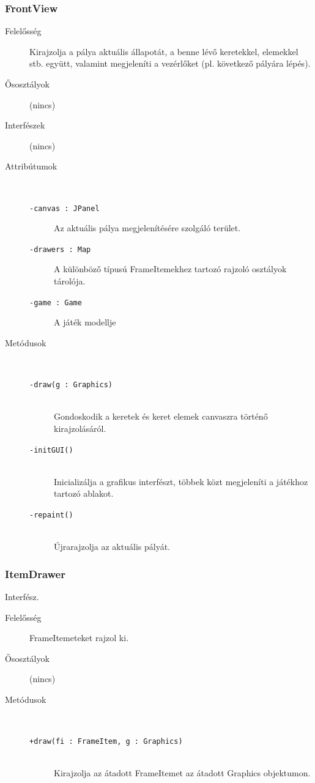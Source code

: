 		\subsubsection{FrontView}
			\begin{description}

				\item[Felelősség] Kirajzolja a pálya aktuális állapotát, a benne lévő keretekkel, elemekkel stb. együtt, valamint megjeleníti a vezérlőket (pl. következő pályára lépés).

				\item[Ősosztályok] (nincs)
				\item[Interfészek] (nincs)
				\item[Attribútumok]$\ $
					\begin{description}
						\item[\texttt{-canvas : JPanel}]Az aktuális pálya megjelenítésére szolgáló terület.
						\item[\texttt{-drawers : Map}]A különböző típusú FrameItemekhez tartozó rajzoló osztályok tárolója.
						\item[\texttt{-game : Game}]A játék modellje
					\end{description}
				\item[Metódusok]$\ $
					\begin{description}
						\item[\texttt{-draw(g : Graphics)}] \hfill \\Gondoskodik a keretek és keret elemek canvaszra történő kirajzolásáról. 
						\item[\texttt{-initGUI()}] \hfill \\Inicializálja a grafikus interfészt,  többek közt megjeleníti a játékhoz tartozó ablakot. 
						\item[\texttt{-repaint()}] \hfill \\Újrarajzolja az aktuális pályát. 
					\end{description}
			\end{description}

		\subsubsection{ItemDrawer} Interfész.
			\begin{description}

				\item[Felelősség] FrameItemeteket rajzol ki.

				\item[Ősosztályok] (nincs)
				\item[Metódusok]$\ $
					\begin{description}
						\item[\texttt{+draw(fi : FrameItem, g : Graphics)}] \hfill \\Kirajzolja az átadott FrameItemet az átadott Graphics objektumon. 
					\end{description}
			\end{description}

